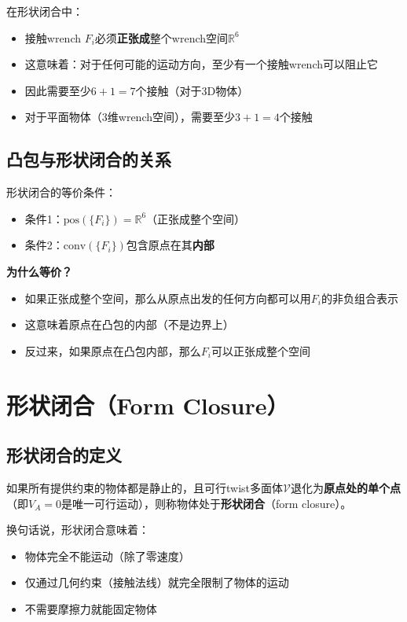 \documentclass[12pt,a4paper]{article}
\begin{document}
在形状闭合中：
\begin{itemize}
\item 接触wrench $F_i$必须\textbf{正张成}整个wrench空间$\mathbb{R}^6$
\item 这意味着：对于任何可能的运动方向，至少有一个接触wrench可以阻止它
\item 因此需要至少$6 + 1 = 7$个接触（对于3D物体）
\item 对于平面物体（3维wrench空间），需要至少$3 + 1 = 4$个接触
\end{itemize}

\subsection{凸包与形状闭合的关系}

形状闭合的等价条件：
\begin{itemize}
\item 条件1：$\text{pos}(\{F_i\}) = \mathbb{R}^6$（正张成整个空间）
\item 条件2：$\text{conv}(\{F_i\})$包含原点在其\textbf{内部}
\end{itemize}

\textbf{为什么等价？}
\begin{itemize}
\item 如果正张成整个空间，那么从原点出发的任何方向都可以用$F_i$的非负组合表示
\item 这意味着原点在凸包的内部（不是边界上）
\item 反过来，如果原点在凸包内部，那么$F_i$可以正张成整个空间
\end{itemize}

\section{形状闭合（Form Closure）}

\subsection{形状闭合的定义}

如果所有提供约束的物体都是静止的，且可行twist多面体$\mathcal{V}$退化为\textbf{原点处的单个点}（即$V_A = 0$是唯一可行运动），则称物体处于\textbf{形状闭合}（form closure）。

换句话说，形状闭合意味着：
\begin{itemize}
\item 物体完全不能运动（除了零速度）
\item 仅通过几何约束（接触法线）就完全限制了物体的运动
\item 不需要摩擦力就能固定物体
\end{itemize}
\end{document}

